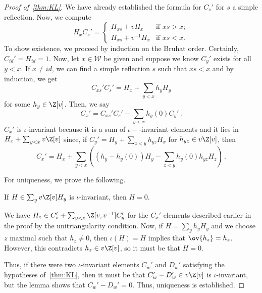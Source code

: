 \documentclass[11pt,leqno,oneside]{amsart}
\numberwithin{thm}{section}
\renewcommand{\W}{\mathcal{W}}
\begin{document}
\begin{proof}[Proof of~\ref{thm:KL}]
  We have already established the formula for \(C_s'\) for \(s\) a
  simple reflection. Now, we compute \[
    H_x C_s' =
    \begin{cases}
      H_{xs} + vH_x & \text{if } xs > x;\\
      H_{xs} + v^{-1} H_x & \text{if } xs < x.
    \end{cases}
  \]
  To show existence, we proceed by induction on
  the Bruhat order. Certainly, \(C_{id}' = H_{id} = 1\). Now, let \(x
  \in \W\) be 
  given and suppose we know \(C_y'\) exists for all \(y < x\). If
  \(x \neq id\), we can find a simple reflection \(s\) such that \(xs
  < x\) and by induction, we get \[
    C_{xs}' C_s' = H_x + \sum_{y < x} h_y H_y
  \]
  for some \(h_y \in \Z[v]\). Then, we say \[
    C_x' = C_{xs}' C_s' - \sum_{y < x} h_y(0) C_y' \,.
  \]
  \(C_x'\) is \(\iota\)-invariant because it is a sum of
  \(\iota-\)-invariant elements and it lies in \(H_x + \sum_{y <
    x}v\Z[v] \) since, if \(C_y' = H_y + \sum_{z < y} h_{yz} H_x\) for
  \(h_{yz} \in v\Z[v]\),
  then \[
    C_x' = H_x + \sum_{y < x} \left( (h_y - h_y(0)) H_y - \sum_{z<y}
      h_y(0) h_{yz} H_z \right) \,.
  \]

  For uniqueness, we prove the following.
  \begin{lem}
    If \(H \in \sum_y v \Z[v] H_y\) is \(\iota\)-invariant, then \(H =
    0\). 
  \end{lem}
  We have \(H_z \in C_z' + \sum_{y < z}\Z[v,v^{-1}] C_y'\) for the
  \(C_x'\) elements described earlier in the proof by the
  unitriangularity condition.  Now, if \(H = \sum_y h_y H_y\) and we
  choose \(z\) maximal such that \(h_z \neq 0\), then \(\iota(H) = H\)
  implies that \(\ov{h_z} = h_z\). However, this contradicts \(h_z \in
  v\Z[v]\), so it must be that \(H = 0\).

  Thus, if there were two \(\iota\)-invariant elements \(C_w'\) and
  \(D_w'\) satisfying the hypotheses of~\ref{thm:KL}, then it must be
  that \(C_w'-D_w' \in v \Z[v]\) is \(\iota\)-invariant, but the lemma
  shows that \(C_w'-D_w' = 0\). Thus, uniqueness is established.
\end{proof}
\begin{bibdiv}
  \begin{biblist}
  \end{biblist}
\end{bibdiv}
\end{document}
